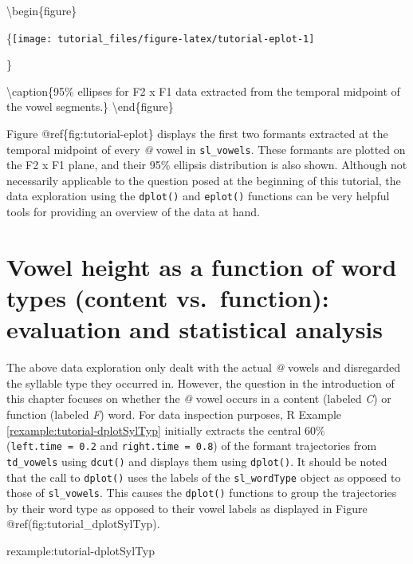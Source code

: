 \documentclass[]{book}
\theoremstyle{definition}
\theoremstyle{definition}
\theoremstyle{definition}
\theoremstyle{remark}
\begin{document}
\textbackslash{}begin\{figure\}

\{\centering \texttt{[image: tutorial\_files/figure-latex/tutorial-eplot-1]}

\}

\textbackslash{}caption\{95\% ellipses for F2 x F1 data extracted from
the temporal midpoint of the vowel segments.\}\label{fig:tutorial-eplot}
\textbackslash{}end\{figure\}

Figure @ref\{fig:tutorial-eplot\} displays the first two formants
extracted at the temporal midpoint of every \emph{@} vowel in
\texttt{sl\_vowels}. These formants are plotted on the F2 x F1 plane,
and their 95\% ellipsis distribution is also shown. Although not
necessarily applicable to the question posed at the beginning of this
tutorial, the data exploration using the \texttt{dplot()} and
\texttt{eplot()} functions can be very helpful tools for providing an
overview of the data at hand.

\hypertarget{vowel-height-as-a-function-of-word-types-content-vs.function-evaluation-and-statistical-analysis}{%
\section{Vowel height as a function of word types (content
vs.~function): evaluation and statistical
analysis}\label{vowel-height-as-a-function-of-word-types-content-vs.function-evaluation-and-statistical-analysis}}

The above data exploration only dealt with the actual \emph{@} vowels
and disregarded the syllable type they occurred in. However, the
question in the introduction of this chapter focuses on whether the
\emph{@} vowel occurs in a content (labeled \emph{C}) or function
(labeled \emph{F}) word. For data inspection purposes, R Example
\ref{rexample:tutorial-dplotSylTyp} initially extracts the central 60\%
(\texttt{left.time\ =\ 0.2} and \texttt{right.time\ =\ 0.8}) of the
formant trajectories from \texttt{td\_vowels} using \texttt{dcut()} and
displays them using \texttt{dplot()}. It should be noted that the call
to \texttt{dplot()} uses the labels of the \texttt{sl\_wordType} object
as opposed to those of \texttt{sl\_vowels}. This causes the
\texttt{dplot()} functions to group the trajectories by their word type
as opposed to their vowel labels as displayed in Figure
@ref(fig:tutorial\_dplotSylTyp).

rexample:tutorial-dplotSylTyp
\end{document}
